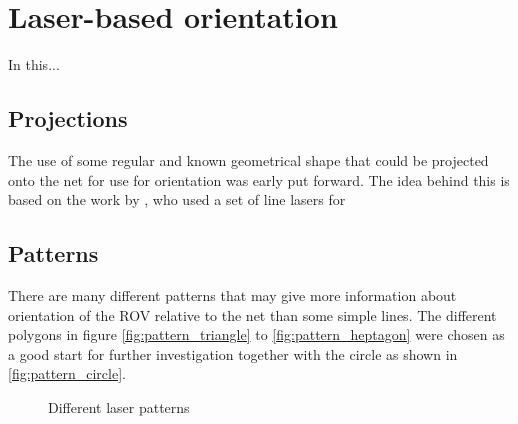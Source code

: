 

\chapter{Laser-based orientation}
In this...

\section{Projections}
The use of some regular and known geometrical shape that could be projected onto the net for use for orientation 
was early put forward. The idea behind this is based on the work by \citet{carlsen10}, who used 
a set of line lasers for 

\section{Patterns}
There are many different patterns that may give more information about 
orientation of the ROV relative to the net than some simple lines. The 
different polygons in figure \vref{fig:pattern_triangle} to \vref{fig:pattern_heptagon}
were chosen as a good start for further investigation together with the 
circle as shown in \vref{fig:pattern_circle}.

\begin{figure}[htbp]
	\hfill
	\hfill
	\hfill
	\hfill
	\hfill
	\hfill
	\caption{Different laser patterns}
	\label{fig:laser_pattern}
\end{figure}
